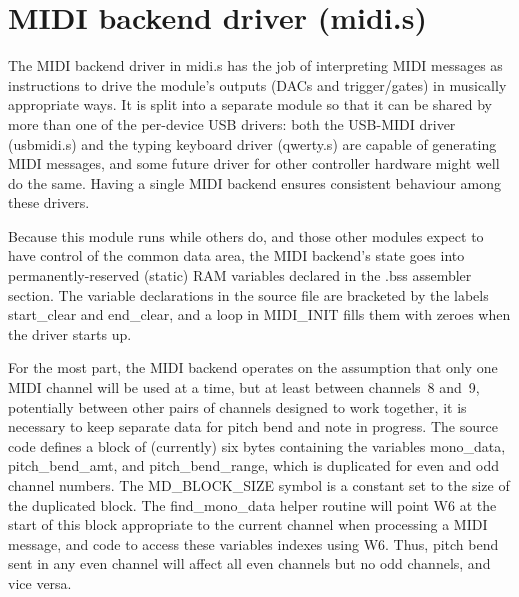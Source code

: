 
%
%
%
%
%
%

\chapter{MIDI backend driver (midi.s)}

The MIDI backend driver in midi.s has the job of interpreting MIDI messages
as instructions to drive the module's outputs (DACs and trigger/gates) in
musically appropriate ways.  It is split into a separate module so that it
can be shared by more than one of the per-device USB drivers: both the
USB-MIDI driver (usbmidi.s) and the typing keyboard driver (qwerty.s) are
capable of generating MIDI messages, and some future driver for other
controller hardware might well do the same.  Having a single MIDI backend
ensures consistent behaviour among these drivers.

Because this module runs while others do, and those other modules expect to
have control of the common data area, the MIDI backend's state goes into
permanently-reserved (static) RAM variables declared in the .bss assembler
section.  The variable declarations in the source file are bracketed by the
labels start\_clear and end\_clear, and a  loop in MIDI\_INIT
fills them with zeroes when the driver starts up.

For the most part, the MIDI backend operates on the assumption that only one
MIDI channel will be used at a time, but at least between channels~8 and~9,
potentially between other pairs of channels designed to work together, it is
necessary to keep separate data for pitch bend and note in progress.  The
source code defines a block of (currently) six bytes containing the
variables mono\_data, pitch\_bend\_amt, and pitch\_bend\_range, which is
duplicated for even and odd channel numbers.  The MD\_BLOCK\_SIZE symbol is
a constant set to the size of the duplicated block.  The find\_mono\_data
helper routine will point W6 at the start of this block appropriate to the
current channel when processing a MIDI message, and code to access these
variables indexes using W6.  Thus, pitch bend sent in any even channel will
affect all even channels but no odd channels, and vice versa.

